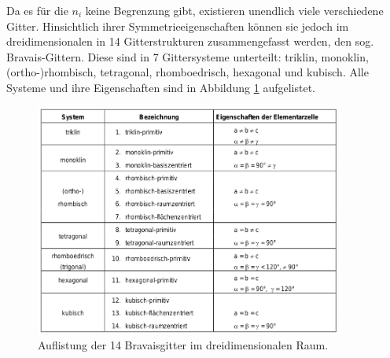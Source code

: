 Da es für die $n_i$ keine Begrenzung gibt, existieren unendlich viele verschiedene Gitter. Hinsichtlich ihrer Symmetrieeigenschaften können sie jedoch im dreidimensionalen in 14 Gitterstrukturen zusammengefasst werden, den sog. Bravais-Gittern. Diese sind in 7 Gittersysteme unterteilt: triklin, monoklin, (ortho-)rhombisch, tetragonal, rhomboedrisch, hexagonal und kubisch. Alle Systeme und ihre Eigenschaften sind in Abbildung \ref{pic:bravais} aufgelistet.
\begin{figure}[htbp]
	\includegraphics[width=0.9\textwidth]{../pics/bravais.png}
	\caption{Auflistung der 14 Bravaisgitter im dreidimensionalen Raum.}
	\label{pic:bravais}
\end{figure}

